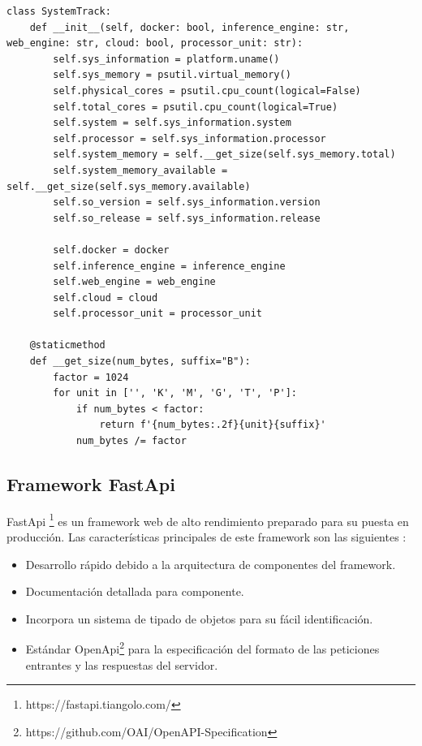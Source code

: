 \begin{lstlisting}[caption=Api, label=lst:system, float=h]
class SystemTrack:
    def __init__(self, docker: bool, inference_engine: str, web_engine: str, cloud: bool, processor_unit: str):
        self.sys_information = platform.uname()
        self.sys_memory = psutil.virtual_memory()
        self.physical_cores = psutil.cpu_count(logical=False)
        self.total_cores = psutil.cpu_count(logical=True)
        self.system = self.sys_information.system
        self.processor = self.sys_information.processor
        self.system_memory = self.__get_size(self.sys_memory.total)
        self.system_memory_available = self.__get_size(self.sys_memory.available)
        self.so_version = self.sys_information.version
        self.so_release = self.sys_information.release

        self.docker = docker
        self.inference_engine = inference_engine
        self.web_engine = web_engine
        self.cloud = cloud
        self.processor_unit = processor_unit

    @staticmethod
    def __get_size(num_bytes, suffix="B"):
        factor = 1024
        for unit in ['', 'K', 'M', 'G', 'T', 'P']:
            if num_bytes < factor:
                return f'{num_bytes:.2f}{unit}{suffix}'
            num_bytes /= factor
\end{lstlisting}
\subsection{Framework FastApi}\label{subsec:framework-fastapi}
FastApi \footnote{https://fastapi.tiangolo.com/} es un framework web de alto rendimiento preparado para su puesta en producción.
Las características principales de este framework son las siguientes :

\begin{itemize}
    \item Desarrollo rápido debido a la arquitectura de componentes del framework.
    \item Documentación detallada para componente.
    \item Incorpora un sistema de tipado de objetos para su fácil identificación.
    \item Estándar OpenApi\footnote{https://github.com/OAI/OpenAPI-Specification} para la especificación del formato de las peticiones entrantes y las respuestas del servidor.
\end{itemize}

